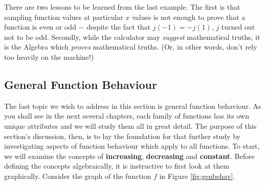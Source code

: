 \medskip

There are two lessons to be learned from the last example.  The first is that sampling function values at particular $x$ values is not enough to prove that a function is even or odd $-$ despite the fact that $j(-1) = - j(1)$, $j$ turned out not to be odd.  Secondly, while the calculator may \emph{suggest} mathematical truths, it is the Algebra which \emph{proves} mathematical truths. (Or, in other words, don't rely too heavily on the machine!)

\medskip

\subsection{General Function Behaviour}
\label{genfuncbehavior}

The last topic we wish to address in this section is general function behaviour.  As you shall see in the next several chapters, each family of functions has its own unique attributes and we will study them all in great detail.  The purpose of this section's discussion, then, is to lay the foundation for that further study by investigating aspects of function behaviour which apply to all functions.  To start, we will examine the concepts of  {\bf increasing},  {\bf decreasing} and  {\bf constant}.  Before defining the concepts algebraically, it is instructive to first look at them graphically.  Consider the graph of the function $f$ in Figure \ref{fig:genbehav}.

